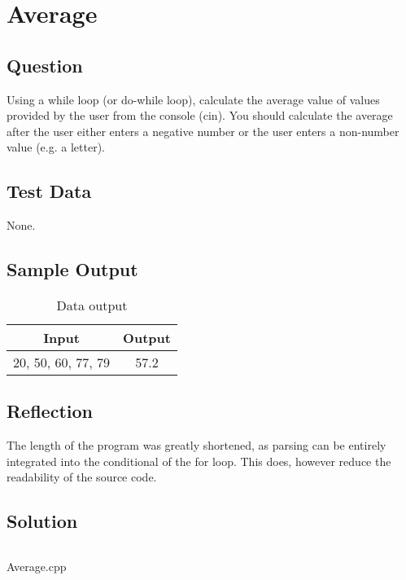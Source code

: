 \section{Average}
    \subsection*{Question}
    Using a while loop (or do-while loop), calculate the average value of values provided by the user from the console (cin).
    You should calculate the average after the user either enters a negative number or the user enters a non-number value (e.g. a letter).
            
    \subsection*{Test Data}
        None.
        
    \subsection*{Sample Output}
        \begin{table}[H]
            \centering
            \begin{tabular}{c c}
                \hline
                \textbf{Input} & \textbf{Output} \\
                \hline
                20, 50, 60, 77, 79 & 57.2 \\
                \hline
            \end{tabular}
            \caption{Data output}
        \end{table}

    \subsection*{Reflection}
        The length of the program was greatly shortened, as parsing can
        be entirely integrated into the conditional of the for loop.
        This does, however reduce the readability of the source code.
        
    \subsection*{Solution}
        \begin{listing}[H]
            \inputminted{cpp}{../Tasks/06-Average/Average.cpp}%
            \caption{Average.cpp}
        \end{listing}